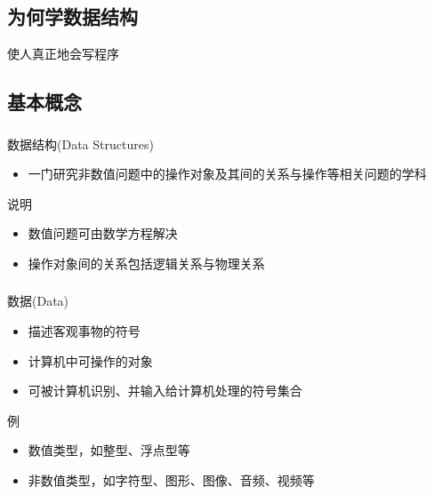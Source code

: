 \subsection{为何学数据结构}

\begin{standout}[\insertsubsectionhead]
    使人真正地会写程序
\end{standout}

\subsection{基本概念}

\begin{fragile}
    \frametitle{\insertsubsectionhead}
    \begin{block}{数据结构(Data Structures)}
        \begin{itemize}
            \item 一门研究\alert{非数值}问题中的操作对象及其间的\alert{关系}与\alert{操作}等相关问题的学科
        \end{itemize}
    \end{block}
    \pause
    \begin{exampleblock}{说明}
        \begin{itemize}
            \item<2-> \alert{数值}问题可由\alert{数学方程}解决
            \item<3-> 操作对象间的关系包括\alert{逻辑}关系与\alert{物理}关系
        \end{itemize}
    \end{exampleblock}
\end{fragile}

\begin{frame}
    \frametitle{\insertsubsectionhead}
    \begin{block}{数据(Data)}
        \begin{itemize}
            \item 描述客观事物的符号
            \item 计算机中可\alert{操作}的对象
            \item 可被计算机\alert{识别}、并输入给计算机\alert{处理}的符号集合
        \end{itemize}
    \end{block}
    \pause
    \begin{exampleblock}{例}
        \begin{itemize}
            \item 数值类型，如\alert{整型、浮点型}等
            \item 非数值类型，如\alert{字符型、图形、图像、音频、视频}等
        \end{itemize}
    \end{exampleblock}
\end{frame}

